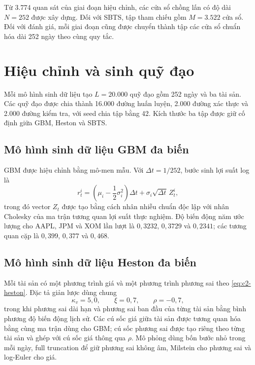 Từ 3.774 quan sát của giai đoạn hiệu chỉnh, các cửa sổ chồng lấn có độ dài
$N=252$ được xây dựng. Đối với SBTS, tập tham chiếu gồm
$M=3.522$ cửa sổ. Đối với đánh giá, mỗi giai đoạn cũng được chuyển thành tập các
cửa sổ chuẩn hóa dài 252 ngày theo cùng quy tắc.

\section{Hiệu chỉnh và sinh quỹ đạo}
\label{sec:c3-calibration}

Mỗi mô hình sinh dữ liệu tạo $L=20.000$ quỹ đạo gồm 252 ngày và ba tài sản.
Các quỹ đạo được chia thành 16.000 đường huấn luyện, 2.000 đường xác thực và
2.000 đường kiểm tra, với seed chia tập bằng 42. Kích thước ba tập được giữ cố
định giữa GBM, Heston và SBTS.

\subsection{Mô hình sinh dữ liệu GBM đa biến}

GBM được hiệu chỉnh bằng mô-men mẫu. Với $\Delta t=1/252$, bước sinh lợi suất
log là
\begin{equation}
    r_t^i=\left(\mu_i-\frac12\sigma_i^2\right)\Delta t
    +\sigma_i\sqrt{\Delta t}\,Z_t^i,
    \label{eq:c3-gbm-discrete}
\end{equation}
trong đó vector $Z_t$ được tạo bằng cách nhân nhiễu chuẩn độc lập với nhân
Cholesky của ma trận tương quan lợi suất thực nghiệm. Độ biến động năm ước
lượng cho AAPL, JPM và XOM lần lượt là $0{,}3232$, $0{,}3729$ và $0{,}2341$;
các tương quan cặp là $0{,}399$, $0{,}377$ và $0{,}468$.

\subsection{Mô hình sinh dữ liệu Heston đa biến}

Mỗi tài sản có một phương trình giá và một phương trình phương sai theo
\eqref{eq:c2-heston}. Đặc tả giản lược dùng chung
\begin{equation}
    \kappa_v=5{,}0,\qquad \xi=0{,}7,\qquad \rho=-0{,}7,
    \label{eq:c3-heston-shared}
\end{equation}
trong khi phương sai dài hạn và phương sai ban đầu của từng tài sản bằng bình
phương độ biến động lịch sử. Các cú sốc giá giữa tài sản được tương quan hóa
bằng cùng ma trận dùng cho GBM; cú sốc phương sai được tạo riêng theo từng tài
sản và ghép với cú sốc giá thông qua $\rho$. Mô phỏng dùng bốn bước nhỏ trong
mỗi ngày, full truncation để giữ phương sai không âm, Milstein cho phương sai
và log-Euler cho giá.

